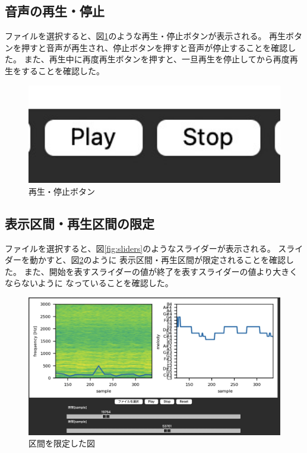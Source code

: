 \documentclass[a4paper,11pt]{jsarticle}
\begin{document}
\subsection{音声の再生・停止}
ファイルを選択すると、図\ref{fig:play_stop_button}のような再生・停止ボタンが表示される。
再生ボタンを押すと音声が再生され、停止ボタンを押すと音声が停止することを確認した。
また、再生中に再度再生ボタンを押すと、一旦再生を停止してから再度再生をすることを確認した。

\begin{figure}[h]
\centering
\includegraphics[keepaspectratio, width=13cm]
{./images/play_stop_buttons.jpg}
\caption{再生・停止ボタン}
\label{fig:play_stop_button}
\end{figure}

\subsection{表示区間・再生区間の限定}
ファイルを選択すると、図\ref{fig:sliders}のようなスライダーが表示される。
スライダーを動かすと、図\ref{fig:filtered_figures}のように
表示区間・再生区間が限定されることを確認した。
また、開始を表すスライダーの値が終了を表すスライダーの値より大きくならないように
なっていることを確認した。

\begin{figure}[h]
\centering
\includegraphics[keepaspectratio, width=13cm]
{./images/filtered_figures.jpg}
\caption{区間を限定した図}
\label{fig:filtered_figures}
\end{figure}
\end{document}
